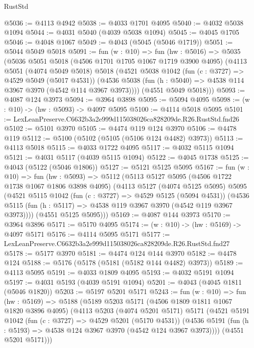 \begin{lexlean}{RustStd}
\begin{coremodule}
@5036 := @4113 @4942
@5038 := @4033 @1701 @4095
@5040 := @4032 @5038 @1094
@5044 := @4031 @5040 (@4039 @5038 @1094)
@5045 := @4045 @1705
@5046 := @4048 @1067
@5049 := @4043 (@5045 (@5046 @1719))
@5051 := @5044 @5049 @5018
@5091 := fun (w : @10) =>
  fun (hw : @5016) =>
  @5035
    (@5036
      @5051
      @5018
      (@4506 @1701 @1705 @1067 @1719 @3900 @4095)
      (@4113
        @5051
        (@4074 @5049 @5018)
        @5018
        (@4521
          @5038
          @1042
          (fun (c : @3727) => @4529 @5049 (@5017 @4531))
          (@4536 @5038 (fun (h : @5040) => @4538 @114 @3967 @3970 (@4542 @114 @3967 @3973))))
        (@4551 @5049 @5018)))
@5093 := @4087 @124 @3973
@5094 := @3964 @3898
@5095 := @5094 @4095
@5098 := (w : @10) -> (hw : @5093) -> @4097 @5095
@5100 := @4114 @5018 @5095
@5101 := LexLeanPreserve.C6632b3a2e999d115038026ca828209de.R26.RustStd.fnd26
@5102 := @5101 @3970
@5105 := @4474 @119 @124 @3970
@5106 := @4478 @119
@5112 := @5100 (@5102 (@5105 (@5106 @124 @4482) @3973))
@5113 := @4113 @5018
@5115 := @4033 @1722 @4095
@5117 := @4032 @5115 @1094
@5121 := @4031 @5117 (@4039 @5115 @1094)
@5122 := @4045 @1738
@5125 := @4043 (@5122 (@5046 @1806))
@5127 := @5121 @5125 @5095
@5167 := fun (w : @10) =>
  fun (hw : @5093) =>
  @5112
    (@5113
      @5127
      @5095
      (@4506 @1722 @1738 @1067 @1806 @3898 @4095)
      (@4113
        @5127
        (@4074 @5125 @5095)
        @5095
        (@4521
          @5115
          @1042
          (fun (c : @3727) => @4529 @5125 (@5094 @4531))
          (@4536 @5115 (fun (h : @5117) => @4538 @119 @3967 @3970 (@4542 @119 @3967 @3973))))
        (@4551 @5125 @5095)))
@5169 := @4087 @144 @3973
@5170 := @3964 @3896
@5171 := @5170 @4095
@5174 := (w : @10) -> (hw : @5169) -> @4097 @5171
@5176 := @4114 @5095 @5171
@5177 := LexLeanPreserve.C6632b3a2e999d115038026ca828209de.R26.RustStd.fnd27
@5178 := @5177 @3970
@5181 := @4474 @124 @144 @3970
@5182 := @4478 @124
@5188 := @5176 (@5178 (@5181 (@5182 @144 @4482) @3973))
@5189 := @4113 @5095
@5191 := @4033 @1809 @4095
@5193 := @4032 @5191 @1094
@5197 := @4031 @5193 (@4039 @5191 @1094)
@5201 := @4043 (@4045 @1811 (@5046 @1820))
@5203 := @5197 @5201 @5171
@5243 := fun (w : @10) =>
  fun (hw : @5169) =>
  @5188
    (@5189
      @5203
      @5171
      (@4506 @1809 @1811 @1067 @1820 @3896 @4095)
      (@4113
        @5203
        (@4074 @5201 @5171)
        @5171
        (@4521
          @5191
          @1042
          (fun (c : @3727) => @4529 @5201 (@5170 @4531))
          (@4536 @5191 (fun (h : @5193) => @4538 @124 @3967 @3970 (@4542 @124 @3967 @3973))))
        (@4551 @5201 @5171)))

\end{coremodule}
\end{lexlean}
